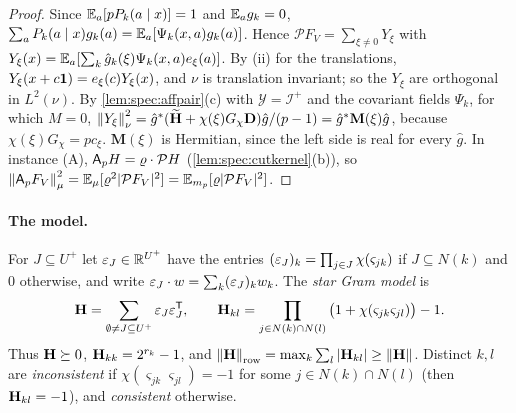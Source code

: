 \begin{proof}
Since $\mathbb E_a[pP_k(a\mid x)]=1$ and $\mathbb E_ag_k=0$,
$\sum_aP_k(a\mid x)g_k(a)=\mathbb E_a[\Psi_k(x,a)g_k(a)]$. Hence $\mathcal PF_V=\sum_{\xi\ne0}Y_\xi$
with $Y_\xi(x)=\mathbb E_a[\sum_k\hat g_k(\xi)\Psi_k(x,a)e_\xi(a)]$. By (ii) for the
translations, $Y_\xi(x+c\mathbf 1)=e_\xi(c)Y_\xi(x)$, and $\nu$ is translation invariant;
so the $Y_\xi$ are orthogonal in $L^2(\nu)$. By \cref{lem:spec:affpair}(c) with
$\mathcal Y=\mathcal I^+$ and the covariant fields $\Psi_k$, for which $M=0$,
$\left\|Y_\xi\right\|^2_\nu=\hat g^*(\widetilde{\mathbf H}+\chi(\xi)G_\chi\mathbf D)\hat g/(p-1)=\hat g^*\mathbf M(\xi)\hat g$,
because $\chi(\xi)G_\chi=pc_\xi$. $\mathbf M(\xi)$ is Hermitian, since the left side is
real for every $\hat g$. In instance (A), $\mathsf A_p H=\varrho\cdot\mathcal PH$
(\cref{lem:spec:cutkernel}(b)), so
$\left\|\mathsf A_p F_V\right\|^2_\mu=\mathbb E_\mu[\varrho^2|\mathcal PF_V|^2]=\mathbb E_{m_p}[\varrho|\mathcal PF_V|^2]$.
\end{proof}

\paragraph{The model.}
For $J\subseteq U^+$ let $\varepsilon_J\in\mathbb R^{U^+}$ have the entries
$(\varepsilon_J)_k=\prod_{j\in J}\chi(\varsigma_{jk})$ if $J\subseteq N(k)$ and $0$ otherwise,
and write $\varepsilon_J\cdot w=\sum_k(\varepsilon_J)_kw_k$. The \emph{star Gram model} is
\begin{equation}\label{eq:spec:H}
  \mathbf H=\sum_{\emptyset\ne J\subseteq U^+}\varepsilon_J\varepsilon_J^{\mathsf T},\qquad
  \mathbf H_{kl}=\prod_{j\in N(k)\cap N(l)}\big(1+\chi(\varsigma_{jk}\varsigma_{jl})\big)-1 .
\end{equation}
Thus $\mathbf H\succeq0$, $\mathbf H_{kk}=2^{r_k}-1$, and
$\left\|\mathbf H\right\|_{\rm row}=\max_k\sum_l|\mathbf H_{kl}|\ge\left\|\mathbf H\right\|$. Distinct $k,l$ are
\emph{inconsistent} if $\chi(\varsigma_{jk}\varsigma_{jl})=-1$ for some
$j\in N(k)\cap N(l)$ (then $\mathbf H_{kl}=-1$), and \emph{consistent} otherwise.

